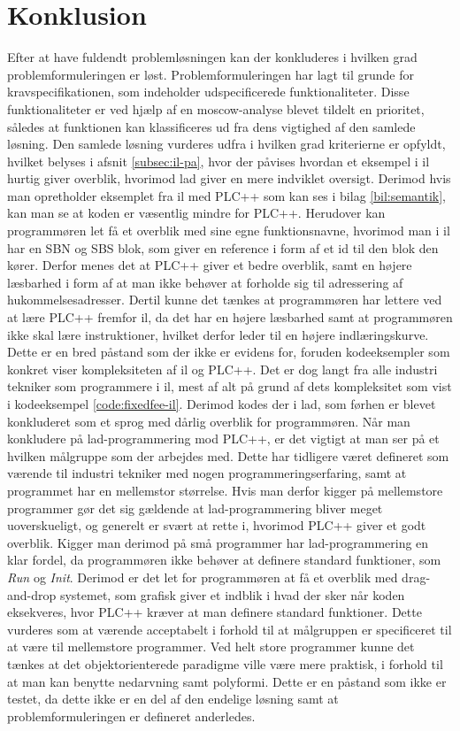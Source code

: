 \chapter{Konklusion}
\label{sec:konklusion}

Efter at have fuldendt problemløsningen kan der konkluderes i hvilken grad problemformuleringen er løst.
Problemformuleringen har lagt til grunde for kravspecifikationen, som indeholder udspecificerede funktionaliteter.
Disse funktionaliteter er ved hjælp af en \gls{moscow}-analyse blevet tildelt en prioritet, således at funktionen kan klassificeres ud fra dens vigtighed af den samlede løsning.
Den samlede løsning vurderes udfra i hvilken grad kriterierne er opfyldt, hvilket belyses i afsnit \ref{subsec:il-pa}, hvor der påvises hvordan et eksempel i \gls{il} hurtig giver overblik, hvorimod \gls{lad} giver en mere indviklet oversigt. Derimod hvis man opretholder eksemplet fra \gls{il} med PLC++ som kan ses i bilag \ref{bil:semantik}, kan man se at koden er væsentlig mindre for PLC++.
Herudover kan programmøren let få et overblik med sine egne funktionsnavne, hvorimod man i \gls{il} har en SBN og SBS blok, som giver en reference i form af et id til den blok den kører.
Derfor menes det at PLC++ giver et bedre overblik, samt en højere læsbarhed i form af at man ikke behøver at forholde sig til adressering af hukommelsesadresser.
Dertil kunne det tænkes at programmøren har lettere ved at lære PLC++ fremfor \gls{il}, da det har en højere  læsbarhed samt at programmøren ikke skal lære instruktioner, hvilket derfor leder til en højere indlæringskurve. Dette er en bred påstand som der ikke er evidens for, foruden kodeeksempler som konkret viser kompleksiteten af \gls{il} og PLC++.
Det er dog langt fra alle industri tekniker som programmere i \gls{il}, mest af alt på grund af dets kompleksitet som vist i kodeeksempel \ref{code:fixedfee-il}.
Derimod kodes der i \gls{lad}, som førhen er blevet konkluderet som et sprog med dårlig overblik for programmøren.
Når man konkludere på \gls{lad}-programmering mod PLC++, er det vigtigt at man ser på et hvilken målgruppe som der arbejdes med.
Dette har tidligere været defineret som værende til industri tekniker med nogen programmeringserfaring, samt at programmet har en mellemstor størrelse.
Hvis man derfor kigger på mellemstore programmer gør det sig gældende at \gls{lad}-programmering bliver meget uoverskueligt, og generelt er svært at rette i, hvorimod PLC++ giver et godt overblik.
Kigger man derimod på små programmer har \gls{lad}-programmering en klar fordel, da programmøren ikke behøver at definere standard funktioner, som \textit{Run} og \textit{Init}. Derimod er det let for programmøren at få et overblik med drag-and-drop systemet, som grafisk giver et indblik i hvad der sker når koden eksekveres, hvor PLC++ kræver at man definere standard funktioner.
Dette vurderes som at værende acceptabelt i forhold til at målgruppen er specificeret til at være til mellemstore programmer.
Ved helt store programmer kunne det tænkes at det objektorienterede paradigme ville være mere praktisk, i forhold til at man kan benytte nedarvning samt polyformi. Dette er en påstand som ikke er testet, da dette ikke er en del af den endelige løsning samt at problemformuleringen er defineret anderledes.

